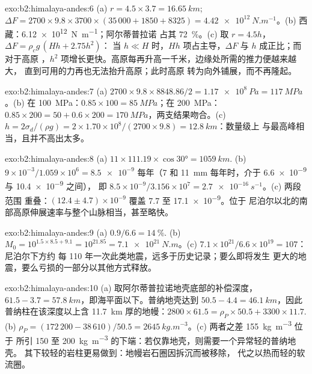 \begin{solution}{exo:b2:himalaya-andes:6}
(a) $r = 4.5\times3.7 = \qty{16.65}{km}$; $\Delta F = 2700\times9.8\times3700\times(35\,000 +
1850 + 8325) = \qty{4.42e12}{N.m^{-1}}$。(b) 西藏：\qty{6.12e12}{N.m^{-1}}；阿尔蒂普拉诺
占其 \qty{72}{\percent}。(c) 取 $r = 4.5h$，$\Delta F = \rho_c g\,(Hh + 2.75h^2)$：
当 $h \ll H$ 时，$Hh$ 项占主导，$\Delta F$ 与 $h$ 成正比；而对于高原
，$h^2$ 项增长更快。高原每再升高一千米，边缘处所需的推力便越来越大，
直到可用的力再也无法抬升高原；此时高原
转为向外铺展，而不再隆起。
\end{solution}

\begin{solution}{exo:b2:himalaya-andes:7}
(a) $2700\times9.8\times8848.86/2 = \qty{1.17e8}{Pa} = \qty{117}{MPa}$。(b) 在
\qty{100}{MPa}：$0.85\times100 = \qty{85}{MPa}$；在 \qty{200}{MPa}：$0.85\times200 = 50 +
0.6\times200 = \qty{170}{MPa}$，两支结果吻合。(c) $h = 2\sigma_d/(\rho g) =
2\times1.70\times10^8/(2700\times9.8) = \qty{12.8}{km}$：数量级上
与最高峰相当，且并不高出太多。
\end{solution}

\begin{solution}{exo:b2:himalaya-andes:8}
(a) $11\times111.19\times\cos\ang{30} = \qty{1059}{km}$. (b) $9\times10^{-3}/1.059\times10^{6}
= \num{8.5e-9}$ 每年（7 和 \qty{11}{mm} 每年时，介于 \num{6.6e-9} 与 \num{10.4e-9} 之间），
即 $8.5\times10^{-9}/3.156\times10^{7} = \qty{2.7e-16}{s^{-1}}$。(c) 两段范围
重叠：$(12.4 \pm 4.7) \times 10^{-9}$ 覆盖 7.7 至 \num{17.1e-9}。位于
尼泊尔以北的南部高原伸展速率与整个山脉相当，甚至略快。
\end{solution}

\begin{solution}{exo:b2:himalaya-andes:9}
(a) $0.9/6.6 = \qty{14}{\percent}$. (b) $M_0 = 10^{1.5\times8.5 + 9.1} = 10^{21.85} =
\qty{7.1e21}{N.m}$。(c) $7.1\times10^{21}/6.6\times10^{19} = 107$：尼泊尔下方约
每 110 年一次此类地震，远多于历史记录；要么即将发生
更大的地震，要么亏损的一部分以其他方式释放。
\end{solution}

\begin{solution}{exo:b2:himalaya-andes:10}
(a) 取阿尔蒂普拉诺地壳底部的补偿深度，$61.5 - 3.7 =
\qty{57.8}{km}$，即海平面以下。普纳地壳达到 $50.5 - 4.4 = \qty{46.1}{km}$，因此
普纳柱在该深度以上含 \qty{11.7}{km} 厚的地幔：$2800\times61.5 =
\rho_P\times50.5 + 3300\times11.7$. (b) $\rho_P = (172\,200 - 38\,610)/50.5 =
\qty{2645}{kg.m^{-3}}$。(c) 两者之差 \qty{155}{kg.m^{-3}} 位于
所引 150 至 \qty{200}{kg.m^{-3}} 的下端：若仅靠地壳，则需要一个异常轻的普纳地壳。
其下较轻的岩柱更易做到：地幔岩石圈因拆沉而被移除，
代之以热而轻的软流圈。
\end{solution}

